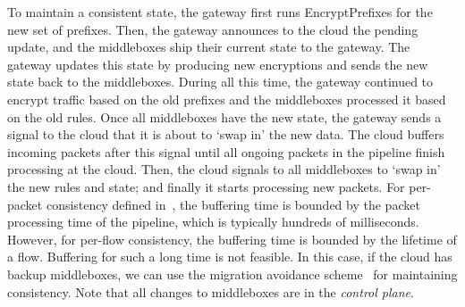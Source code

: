 To maintain a consistent state, the gateway first runs EncryptPrefixes for the new set of prefixes. 
Then, the gateway announces to the cloud the pending update, and the middleboxes 
ship their current state to the gateway. The gateway updates this state by producing new encryptions 
and sends the new state back to the middleboxes. During all this time, the gateway continued to encrypt 
traffic based on the old prefixes and the middleboxes processed it based on the old rules.
Once all middleboxes have the new state, the gateway sends a signal to the cloud that it is about 
to `swap in' the new data. The cloud buffers incoming packets after this signal until all ongoing packets 
in the pipeline finish processing at the cloud. Then, the cloud signals to all middleboxes to `swap in'
the new rules and state; and finally it starts processing new packets. For per-packet 
consistency defined in~\cite{sdn-consistent-update}, the buffering time is bounded by the packet processing time of
the pipeline, which is typically hundreds of milliseconds. However, for per-flow consistency, the buffering time
is bounded by the lifetime of a flow. Buffering for such a long time is not feasible. 
In this case, if the cloud has backup middleboxes, we can use the migration avoidance 
scheme~\cite{e2} for maintaining consistency. Note that all changes to 
middleboxes are in the {\it control plane}.






